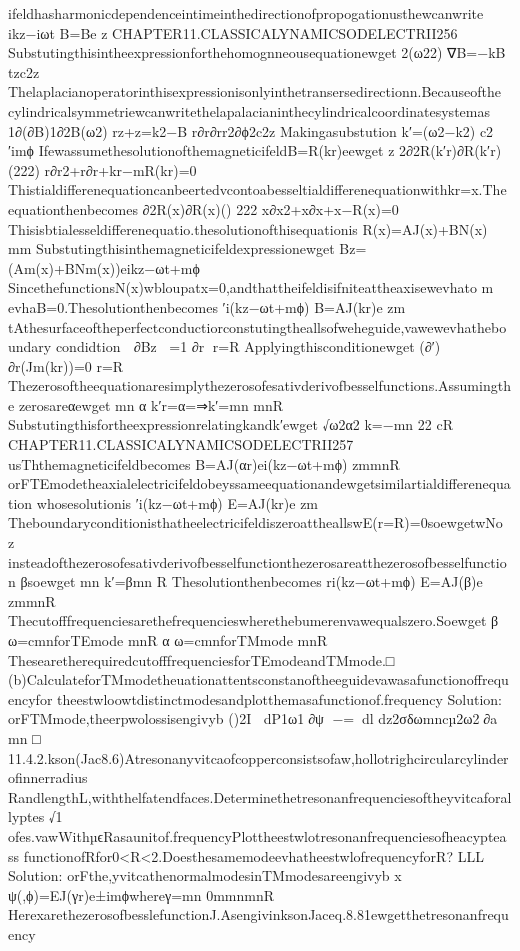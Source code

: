 {{{{{{{{{{{{{{{{ifeldhasharmonicdependenceintimeinthedirectionofpropogationusthewcanwrite
ikz−iωt
B=Be
z
CHAPTER11.CLASSICALYNAMICSODELECTRII256
Substutingthisintheexpressionforthehomognneousequationewget
2(ω22)
∇B=−kB
tzc2z
Thelaplacianoperatorinthisexpressionisonlyinthetransersedirectionn.Becauseofthe
cylindricalsymmetriewcanwritethelapalacianinthecylindricalcoordinatesystemas
1∂(∂B)1∂2B(ω2)
rz+z=k2−B
r∂r∂rr2∂ϕ2c2z
Makingasubstution
k′=(ω2−k2)
c2
′imϕ
IfewassumethesolutionofthemagneticifeldB=R(kr)eewget
z
2∂2R(k′r)∂R(k′r)(222)
r∂r2+r∂r+kr−mR(kr)=0
Thistialdifferenequationcanbeertedvcontoabesseltialdifferenequationwithkr=x.The
equationthenbecomes
∂2R(x)∂R(x)()
222
x∂x2+x∂x+x−R(x)=0
Thisisbtialesseldifferenequatio.thesolutionofthisequationis
R(x)=AJ(x)+BN(x)
mm
Substutingthisinthemagneticifeldexpressionewget
Bz=(Am(x)+BNm(x))eikz−ωt+mϕ
SincethefunctionsN(x)wbloupatx=0,andthattheifeldisifniteattheaxisewevhato
m
evhaB=0.Thesolutionthenbecomes
′i(kz−ωt+mϕ)
B=AJ(kr)e
zm
tAthesurfaceoftheperfectconductiorconstutingtheallsofweheguide,vawewevhatheboundary
condidtion

∂Bz
=1
∂r
r=R
Applyingthisconditionewget
(∂′)
∂r(Jm(kr))=0
r=R
Thezerosoftheequationaresimplythezerosofesativderivofbesselfunctions.Assumingthe
zerosareαewget
mn
α
k′r=α=⇒k′=mn
mnR
Substutingthisfortheexpressionrelatingkandk′ewget
√ω2α2
k=−mn
22
cR
CHAPTER11.CLASSICALYNAMICSODELECTRII257
usThthemagneticifeldbecomes
B=AJ(αr)ei(kz−ωt+mϕ)
zmmnR
orFTEmodetheaxialelectricifeldobeyssameequationandewgetsimilartialdifferenequation
whosesolutionis
′i(kz−ωt+mϕ)
E=AJ(kr)e
zm
TheboundaryconditionisthatheelectricifeldiszeroattheallswE(r=R)=0soewgetwNo
z
insteadofthezerosofesativderivofbesselfunctionthezerosareatthezerosofbesselfunction
βsoewget
mn
k′=βmn
R
Thesolutionthenbecomes
ri(kz−ωt+mϕ)
E=AJ(β)e
zmmnR
Thecutofffrequenciesarethefrequencieswherethebumerenvawequalszero.Soewget
β
ω=cmnforTEmode
mnR
α
ω=cmnforTMmode
mnR
ThesearetherequiredcutofffrequenciesforTEmodeandTMmode.□
(b)CalculateforTMmodetheuationattentsconstanoftheeguidevawasafunctionoffrequencyfor
theestwloowtdistinctmodesandplotthemasafunctionof.frequency
Solution:
orFTMmode,theerpwolossisengivyb
()2I
dP1ω1∂ψ
−=dl
dz2σδωmncµ2ω2∂a
mn
□
11.4.2.kson(Jac8.6)Atresonanyvitcaofcopperconsistsofaw,hollotrighcircularcylinderofinnerradius
RandlengthL,withthelfatendfaces.Determinethetresonanfrequenciesoftheyvitcaforallyptes
√1
ofes.vawWithµϵRasaunitof.frequencyPlottheestwlotresonanfrequenciesofheacypteass
functionofRfor0<R<2.DoesthesamemodeevhatheestwlofrequencyforR?
LLL
Solution:
orFthe,yvitcathenormalmodesinTMmodesareengivyb
x
ψ(,ϕ)=EJ(γr)e±imϕwhereγ=mn
0mmnmnR
HerexarethezerosofbesslefunctionJ.AsengivinksonJaceq.8.81ewgetthetresonanfrequency
}}}}}}}}}}}}}}}}
